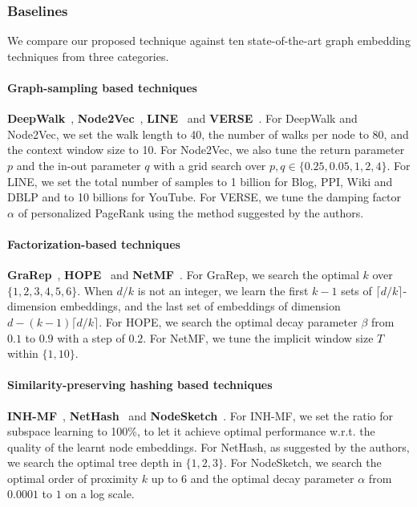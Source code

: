 \documentclass[conference]{IEEEtran}
\begin{document}
\subsubsection{Baselines}
We compare our proposed technique against ten state-of-the-art graph embedding techniques from three categories.
\paragraph{Graph-sampling based techniques} \textbf{DeepWalk}~\cite{Dpwk14}, \textbf{Node2Vec}~\cite{nd2v16}, \textbf{LINE}~\cite{tang2015line} and \textbf{VERSE}~\cite{tsitsulin2018verse}. For DeepWalk and Node2Vec, we set the walk length to 40, the number of walks per node to 80, and the context window size to 10. For Node2Vec, we also tune the return parameter $p$ and the in-out parameter $q$ with a grid search over $p,q \in \{0.25,0.05,1,2,4\}$. For LINE, we set the total number of samples to 1 billion for Blog, PPI, Wiki and DBLP and to 10 billions for YouTube. For VERSE, we tune the damping factor $\alpha$ of personalized PageRank using the method suggested by the authors.


\paragraph{Factorization-based techniques} \textbf{GraRep}~\cite{cao2015grarep}, \textbf{HOPE}~\cite{Ou16} and \textbf{NetMF}~\cite{qiu2018network}. For GraRep, we search the optimal $k$ over $\{1,2,3,4,5,6\}$. When $d/k$ is not an integer, we learn the first $k-1$ sets of $\lceil d/k \rceil$-dimension embeddings, and the last set of embeddings of dimension $d-(k-1)\lceil d/k \rceil$. For HOPE, we search the optimal decay parameter $\beta$ from $0.1$ to $0.9$ with a step of $0.2$. For NetMF, we tune the implicit window size $T$ within $\{1,10\}$.


\paragraph{Similarity-preserving hashing based techniques} \textbf{INH-MF}~\cite{lian2018high}, \textbf{NetHash}~\cite{wu2018efficient} and \textbf{NodeSketch}~\cite{yang2019nodesketch}. For INH-MF, we set the ratio for subspace learning to 100\%, to let it achieve optimal performance w.r.t. the quality of the learnt node embeddings. For NetHash, as suggested by the authors, we search the optimal tree depth in $\{1,2,3\}$. For NodeSketch, we search the optimal order of proximity $k$ up to $6$ and the optimal decay parameter $\alpha$ from $0.0001$ to $1$ on a log scale.
\end{document}
